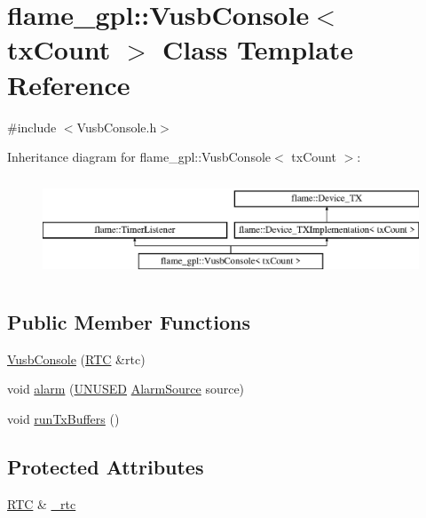 \hypertarget{classflame__gpl_1_1_vusb_console}{\section{flame\-\_\-gpl\-:\-:Vusb\-Console$<$ tx\-Count $>$ Class Template Reference}
\label{classflame__gpl_1_1_vusb_console}
}


{\ttfamily \#include $<$Vusb\-Console.\-h$>$}

Inheritance diagram for flame\-\_\-gpl\-:\-:Vusb\-Console$<$ tx\-Count $>$\-:\begin{figure}[H]
\begin{center}
\leavevmode
\includegraphics[height=3.000000cm]{classflame__gpl_1_1_vusb_console}
\end{center}
\end{figure}
\subsection*{Public Member Functions}
\begin{DoxyCompactItemize}
\item 
\hyperlink{classflame__gpl_1_1_vusb_console_a571209ae3db5f8d75091ee8c6c17a862}{Vusb\-Console} (\hyperlink{classflame_1_1_r_t_c}{R\-T\-C} \&rtc)
\item 
void \hyperlink{classflame__gpl_1_1_vusb_console_a061bc8d41aa75d4eedf0b070b76b4bdc}{alarm} (\hyperlink{io_8h_addf5ec070e9499d36b7f2009ce736076}{U\-N\-U\-S\-E\-D} \hyperlink{namespaceflame_a6d176ba245556716fd3e32006bb7cfe5}{Alarm\-Source} source)
\item 
void \hyperlink{classflame__gpl_1_1_vusb_console_a5deb453bdc18579c6f3c592862f71fab}{run\-Tx\-Buffers} ()
\end{DoxyCompactItemize}
\subsection*{Protected Attributes}
\begin{DoxyCompactItemize}
\item 
\hyperlink{classflame_1_1_r_t_c}{R\-T\-C} \& \hyperlink{classflame__gpl_1_1_vusb_console_a197a4912e9da1bb6a10b13c0f8026e74}{\-\_\-rtc}
\end{DoxyCompactItemize}

